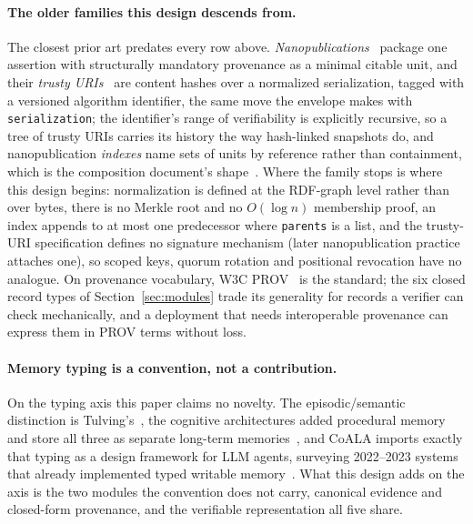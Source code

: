 \documentclass[11pt,a4paper]{article}
\begin{document}
\paragraph{The older families this design descends from.}
The closest prior art predates every row above.
\emph{Nanopublications}~\cite{groth2010anatomy} package one assertion with
structurally mandatory provenance as a minimal citable unit, and their
\emph{trusty URIs}~\cite{kuhn2014trusty} are content hashes over a normalized
serialization, tagged with a versioned algorithm identifier, the same move the
envelope makes with \texttt{serialization}; the identifier's range of
verifiability is explicitly recursive, so a tree of trusty URIs carries its
history the way hash-linked snapshots do, and nanopublication \emph{indexes}
name sets of units by reference rather than containment, which is the
composition document's shape~\cite{kuhn2016decentralized}. Where the family
stops is where this design begins: normalization is defined at the RDF-graph
level rather than over bytes, there is no Merkle root and no $O(\log n)$
membership proof, an index appends to at most one predecessor where
\texttt{parents} is a list, and the trusty-URI specification defines no
signature mechanism (later nanopublication practice attaches one), so scoped
keys, quorum rotation and positional revocation have no analogue. On
provenance vocabulary, W3C PROV~\cite{provo2013} is the standard; the six
closed record types of Section~\ref{sec:modules} trade its generality for
records a verifier can check mechanically, and a deployment that needs
interoperable provenance can express them in PROV terms without loss.

\paragraph{Memory typing is a convention, not a contribution.}
On the typing axis this paper claims no novelty. The episodic/semantic
distinction is Tulving's~\cite{tulving1972}, the cognitive architectures added
procedural memory and store all three as separate long-term
memories~\cite{laird1987soar}, and CoALA imports exactly that typing as a
design framework for LLM agents, surveying 2022--2023 systems that already
implemented typed writable memory~\cite{sumers2024coala}. What this design
adds on the axis is the two modules the convention does not carry, canonical
evidence and closed-form provenance, and the verifiable representation all
five share.

\end{document}
